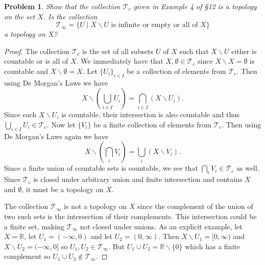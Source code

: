 \documentclass{article}
\newtheorem{problem}{Problem}
\begin{document}
\begin{problem}
Show that the collection $\mathcal{T}_c$ given in Example 4 of \S 12 is a topology on the set $X$. Is the collection
\[
\mathcal{T}_{\infty} = \{U \mid \text{$X \backslash U$ is infinite or empty or all of $X$}\}
\]
a topology on $X$?
\end{problem}
\begin{proof}
The collection $\mathcal{T}_c$ is the set of all subsets $U$ of $X$ such that $X \backslash U$ either is countable or is all of $X$. We immediately have that $X, \emptyset \in \mathcal{T}_c$ since $X \backslash X = \emptyset$ is countable and $X \backslash \emptyset = X$. Let $\{U_i\}_{i \in I}$ be a collection of elements from $\mathcal{T}_c$. Then using De Morgan's Laws we have
\[
X \backslash \left ( \bigcup_{i \in I} U_i \right ) = \bigcap_{i \in I} (X \backslash U_i).
\]
Since each $X \backslash U_i$ is countable, their intersection is also countable and thus $\bigcup_{i \in I} U_i \in \mathcal{T}_c$. Now let $\{V_i\}$ be a finite collection of elements from $\mathcal{T}_c$. Then using De Morgan's Laws again we have
\[
X \backslash \left ( \bigcap_{i} V_i \right ) = \bigcup_{i} (X \backslash V_i).
\]
Since a finite union of countable sets is countable, we see that $\bigcap_{i} V_i \in \mathcal{T}_c$ as well. Since $\mathcal{T}_c$ is closed under arbitrary union and finite intersection and contains $X$ and $\emptyset$, it must be a topology on $X$.

The collection $\mathcal{T}_{\infty}$ is not a topology on $X$ since the complement of the union of two such sets is the intersection of their complements. This intersection could be a finite set, making $\mathcal{T}_{\infty}$ not closed under unions. As an explicit example, let $X = \mathbb{R}$, let $U_1 = (-\infty,0)$ and let $U_2 = (0,\infty)$. Then $X \backslash U_1 = [0, \infty)$ and $X \backslash U_2 = (-\infty, 0]$ so $U_1, U_2 \in \mathcal{T}_{\infty}$. But $U_1 \cup U_2 = \mathbb{R} \backslash \{0\}$ which has a finite complement so $U_1 \cup U_2 \notin \mathcal{T}_{\infty}$.
\end{proof}
\end{document}
